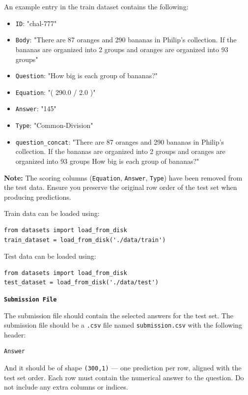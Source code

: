 \documentclass{fairmeta}
\begin{document}
\begin{tcolorbox}[
  colback=md-bg,
  colframe=md-bg,
  boxrule=0pt,
  left=10pt,
  right=10pt,
  top=10pt,
  bottom=10pt,
  sharp corners,
  enhanced
]
{An example entry in the train dataset contains the following:
\begin{itemize}
  \item \texttt{ID}: "chal-777"
  \item \texttt{Body}: "There are 87 oranges and 290 bananas in Philip's collection. If the bananas are organized into 2 groups and oranges are organized into 93 groups"
  \item \texttt{Question}: "How big is each group of bananas?"
  \item \texttt{Equation}: "( 290.0 / 2.0 )"
  \item \texttt{Answer}: "145"
  \item \texttt{Type}: "Common-Division"
  \item \texttt{question\_concat}: "There are 87 oranges and 290 bananas in Philip's collection. If the bananas are organized into 2 groups and oranges are organized into 93 groups How big is each group of bananas?"
\end{itemize}

\textbf{Note:} The scoring columns (\texttt{Equation}, \texttt{Answer}, \texttt{Type}) have been removed from the test data. Ensure you preserve the original row order of the test set when producing predictions.

Train data can be loaded using:
\begin{verbatim}
from datasets import load_from_disk
train_dataset = load_from_disk('./data/train')
\end{verbatim}

Test data can be loaded using:
\begin{verbatim}
from datasets import load_from_disk
test_dataset = load_from_disk('./data/test')
\end{verbatim}

\vspace{0.6em}

{\large\bfseries\color{md-heading}\texttt{Submission File}}
\vspace{0.2em}

The submission file should contain the selected answers for the test set. The submission file should be a \texttt{.csv} file named \colorbox{md-code-bg}{\texttt{\color{md-code}submission.csv}} with the following header:
\begin{verbatim}
Answer
\end{verbatim}
And it should be of shape \colorbox{md-code-bg}{\texttt{\color{md-code}(300,1)}} — one prediction per row, aligned with the test set order. Each row must contain the numerical answer to the question. Do not include any extra columns or indices.

}
\end{tcolorbox}
\end{document}

